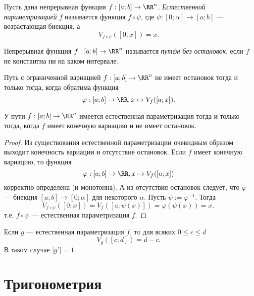 \documentclass[12pt,a4paper]{article}
\begin{document}
    \begin{definition}
        Пусть дана непрерывная функция $f: [a; b] \to \RR^n$. \emph{Естественной параметризацией} $f$ называется функция $f \circ \psi$, где $\psi: [0; \alpha] \to [a; b]$ --- возрастающая биекция, а
        \[V_{f \circ \psi}([0; x]) = x.\]
    \end{definition}

    \begin{definition}
        Непрерывная функция $f: [a; b] \to \RR^n$ называется \emph{путём без остановок}, если $f$ не константна ни на каком интервале.
    \end{definition}

    \begin{lemma}
        Путь с ограниченной вариацией $f: [a; b] \to \RR^n$ не имеет остановок тогда и только тогда, когда обратима функция
        \[\varphi: [a; b] \to \RR, x \mapsto V_f([a; x]).\] 
    \end{lemma}

    \begin{theorem}
        У пути $f: [a; b] \to \RR^n$ имеется естественная параметризация тогда и только тогда, когда $f$ имеет конечную вариацию и не имеет остановок.
    \end{theorem}

    \begin{proof}
        Из существования естественной параметризации очевидным образом выходит конечность вариации и отсутствие остановок. Если $f$ имеет конечную вариацию, то функция
        \[\varphi: [a; b] \to \RR, x \mapsto V_f([a; x])\]
        корректно определена (и монотонна). А из отсутствия остановок следует, что $\varphi$ --- биекция $[a; b] \to [0; \alpha]$ для некоторого $\alpha$. Пусть $\psi := \varphi^{-1}$. Тогда
        \[V_{f \circ \psi}([0; x]) = V_f([a; \psi(x)]) = \varphi(\psi(x)) = x,\]
        т.е. $f \circ \psi$ --- естественная параметризация $f$.
    \end{proof}

    \begin{remark*}
        Если $g$ --- естественная параметризация $f$, то для всяких $0 \leqslant c \leqslant d$
        \[V_g([c; d]) = d - c.\]
        В таком случае $|g'| = 1$.
    \end{remark*}

    \section{Тригонометрия}
\end{document}
